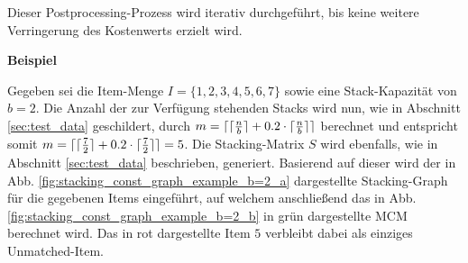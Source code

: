 Dieser Postprocessing-Prozess wird iterativ durchgeführt, bis keine weitere Verringerung des Kostenwerts erzielt wird.

\textbf{Beispiel}

Gegeben sei die Item-Menge $I = \{1, 2, 3, 4, 5, 6, 7\}$ sowie eine Stack-Kapazität von $b = 2$.
Die Anzahl der zur Verfügung stehenden Stacks wird nun, wie in Abschnitt \ref{sec:test_data} geschildert,
durch $m = \lceil\lceil\frac{n}{b}\rceil + 0.2 \cdot \lceil\frac{n}{b}\rceil\rceil$ berechnet und entspricht somit
$m = \lceil\lceil\frac{7}{2}\rceil + 0.2 \cdot \lceil\frac{7}{2}\rceil\rceil = 5$.
Die Stacking-Matrix $S$ wird ebenfalls, wie in Abschnitt \ref{sec:test_data} beschrieben, generiert.
Basierend auf dieser wird der in Abb. \ref{fig:stacking_const_graph_example_b=2_a} dargestellte Stacking-Graph
für die gegebenen Items eingeführt, auf welchem anschließend das in Abb. \ref{fig:stacking_const_graph_example_b=2_b} in grün dargestellte \textsc{MCM} berechnet wird. Das in rot dargestellte Item $5$ verbleibt dabei als einziges Unmatched-Item.
